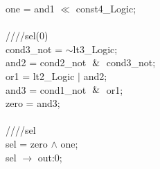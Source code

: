 {   \hspace*{2em}one = and1 $\ll$ const4\_Logic; \\
   \\
   \hspace*{2em}////sel(0) \\
   \hspace*{2em}cond3\_not = $\sim$lt3\_Logic; \\
   \hspace*{2em}and2 = cond2\_not $\And$ cond3\_not; \\
   \hspace*{2em}or1 = lt2\_Logic $\vert$ and2; \\
   \hspace*{2em}and3 = cond1\_not $\And$ or1; \\
   \hspace*{2em}zero = and3; \\
   \\
   \hspace*{2em}////sel \\
   \hspace*{2em}sel = zero $\wedge$ one; \\
   \hspace*{2em}sel $\rightarrow$ out:0; \\
} \\
\\
\\
